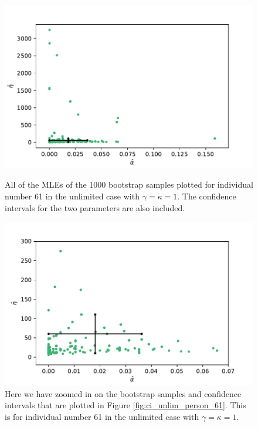 \begin{figure}
    \centering
    \begin{minipage}{0.48\textwidth}
        \centering
        \includegraphics[scale=0.36]{pictures/ci_unlim_person61_pdf.pdf}
        \caption[MLEs of bootstrap samples individual 61, unlimited]{All of the MLEs of the 1000 bootstrap samples plotted for individual number 61 in the unlimited case with $\gamma=\kappa=1$. The confidence intervals for the two parameters are also included.}
        \label{fig:ci_unlim_person_61}
    \end{minipage}\hfill
    \begin{minipage}{0.48\textwidth}
        \centering
        \includegraphics[scale=0.36]{pictures/ci_unlim_person61_zoomed_pdf.pdf}
        \caption[MLEs of bootstrap samples individual 61, unlimited, zoomed]{Here we have zoomed in on the bootstrap samples and confidence intervals that are plotted in Figure \ref{fig:ci_unlim_person_61}. This is for individual number 61 in the unlimited case with $\gamma=\kappa=1$.}
        \label{fig:ci_unlim_person_61_zoomed}
    \end{minipage}
\end{figure}

